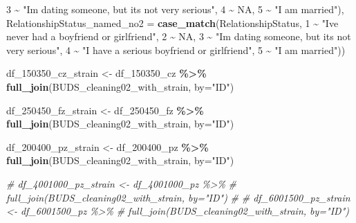 \documentclass[
]{article}
\newenvironment{Shaded}{\begin{snugshade}}{\end{snugshade}}
\newcommand{\AttributeTok}[1]{\textcolor[rgb]{0.13,0.29,0.53}{#1}}
\newcommand{\CommentTok}[1]{\textcolor[rgb]{0.56,0.35,0.01}{\textit{#1}}}
\newcommand{\ConstantTok}[1]{\textcolor[rgb]{0.56,0.35,0.01}{#1}}
\newcommand{\DecValTok}[1]{\textcolor[rgb]{0.00,0.00,0.81}{#1}}
\newcommand{\FunctionTok}[1]{\textcolor[rgb]{0.13,0.29,0.53}{\textbf{#1}}}
\newcommand{\NormalTok}[1]{#1}
\newcommand{\OtherTok}[1]{\textcolor[rgb]{0.56,0.35,0.01}{#1}}
\newcommand{\SpecialCharTok}[1]{\textcolor[rgb]{0.81,0.36,0.00}{\textbf{#1}}}
\newcommand{\StringTok}[1]{\textcolor[rgb]{0.31,0.60,0.02}{#1}}
\begin{document}
\begin{Shaded}
\begin{Highlighting}[]
                                        \DecValTok{3} \SpecialCharTok{\textasciitilde{}} \StringTok{"I\textquotesingle{}m dating someone, but it\textquotesingle{}s not very serious"}\NormalTok{,}
                                        \DecValTok{4} \SpecialCharTok{\textasciitilde{}} \ConstantTok{NA}\NormalTok{,}
                                        \DecValTok{5} \SpecialCharTok{\textasciitilde{}} \StringTok{"I am married"}\NormalTok{),}
         \AttributeTok{RelationshipStatus\_named\_no2 =} \FunctionTok{case\_match}\NormalTok{(RelationshipStatus, }\DecValTok{1} \SpecialCharTok{\textasciitilde{}} \StringTok{"I\textquotesingle{}ve never had a boyfriend or girlfriend"}\NormalTok{,}
                                        \DecValTok{2} \SpecialCharTok{\textasciitilde{}} \ConstantTok{NA}\NormalTok{,}
                                        \DecValTok{3} \SpecialCharTok{\textasciitilde{}} \StringTok{"I\textquotesingle{}m dating someone, but it\textquotesingle{}s not very serious"}\NormalTok{,}
                                        \DecValTok{4} \SpecialCharTok{\textasciitilde{}} \StringTok{"I have a serious boyfriend or girlfriend"}\NormalTok{,}
                                        \DecValTok{5} \SpecialCharTok{\textasciitilde{}} \StringTok{"I am married"}\NormalTok{))}



\NormalTok{df\_150350\_cz\_strain }\OtherTok{\textless{}{-}}\NormalTok{ df\_150350\_cz }\SpecialCharTok{\%\textgreater{}\%}
  \FunctionTok{full\_join}\NormalTok{(BUDS\_cleaning02\_with\_strain, }\AttributeTok{by=}\StringTok{"ID"}\NormalTok{)}
  
\NormalTok{df\_250450\_fz\_strain }\OtherTok{\textless{}{-}}\NormalTok{ df\_250450\_fz }\SpecialCharTok{\%\textgreater{}\%}
  \FunctionTok{full\_join}\NormalTok{(BUDS\_cleaning02\_with\_strain, }\AttributeTok{by=}\StringTok{"ID"}\NormalTok{)}

\NormalTok{df\_200400\_pz\_strain }\OtherTok{\textless{}{-}}\NormalTok{ df\_200400\_pz }\SpecialCharTok{\%\textgreater{}\%}
  \FunctionTok{full\_join}\NormalTok{(BUDS\_cleaning02\_with\_strain, }\AttributeTok{by=}\StringTok{"ID"}\NormalTok{)}

\CommentTok{\# df\_4001000\_pz\_strain \textless{}{-} df\_4001000\_pz \%\textgreater{}\%}
\CommentTok{\#   full\_join(BUDS\_cleaning02\_with\_strain, by="ID")}
\CommentTok{\# }
\CommentTok{\# df\_6001500\_pz\_strain \textless{}{-} df\_6001500\_pz \%\textgreater{}\%}
\CommentTok{\#   full\_join(BUDS\_cleaning02\_with\_strain, by="ID")}


\end{Highlighting}
\end{Shaded}
\end{document}
